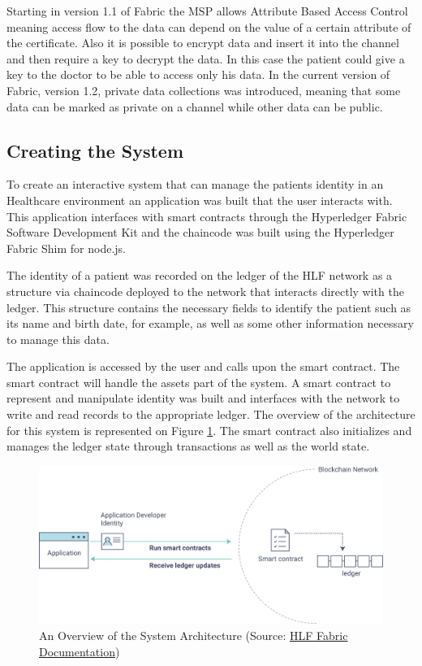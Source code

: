 Starting in version 1.1 of Fabric the MSP allows Attribute Based Access Control
meaning access flow to the data can depend on the value of a certain attribute
of the certificate. Also it is possible to encrypt data and insert it into the
channel and then require a key to decrypt the data. In this case the patient
could give a key to the doctor to be able to access only his data. In the
current version of Fabric, version 1.2, private data collections was
introduced, meaning that some data can be marked as private on a channel while
other data can be public.


\subsection{Creating the System}

To create an interactive system that can manage the patients identity in an
Healthcare environment an application was built that the user interacts with.
This application interfaces with smart contracts through the Hyperledger Fabric
Software Development Kit and the chaincode was built using the Hyperledger
Fabric Shim for node.js.

The identity of a patient was recorded on the ledger of the HLF network as a
structure via chaincode deployed to the network that interacts directly with
the ledger.  This structure contains the necessary fields to identify the
patient such as its name and birth date, for example, as well as some other
information necessary to manage this data. 

The application is accessed by the user and calls upon the smart contract.  The
smart contract will handle the assets part of the system.  A smart contract to
represent and manipulate identity was built and interfaces with the network to
write and read records to the appropriate ledger. The overview of the
architecture for this system is represented on Figure \ref{fig:appOverview}.
The smart contract also initializes and manages the ledger state through
transactions as well as the world state.

\begin{figure}[ht] \centering
  \includegraphics[width=1\linewidth]{imgs/hyperledgerAppOverview.png}
  \caption{\label{fig:appOverview}An Overview of the System Architecture
  (Source:
  \href{http://hyperledger-fabric.readthedocs.io/en/latest/write_first_app.html}{HLF
  Fabric Documentation})} \end{figure}


